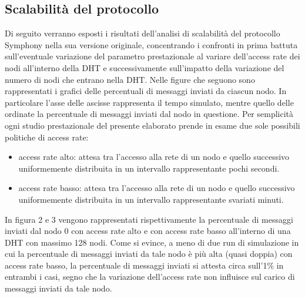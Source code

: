 \documentclass[	
	DIV=calc,
	paper=a4,
	fontsize=11pt,
	onecolumn
]{scrartcl} %
\begin{document}
	\subsection{Scalabilità del protocollo}
	Di seguito verranno esposti i risultati dell'analisi di scalabilità del protocollo Symphony nella sua versione originale, concentrando i confronti in prima battuta sull'eventuale variazione del parametro prestazionale al variare dell'access rate dei nodi all'interno della DHT e successivamente sull'impatto della variazione del numero di nodi che entrano nella DHT.
Nelle figure che seguono sono rappresentati i grafici delle percentuali di messaggi inviati da ciascun nodo. In particolare l'asse delle ascisse rappresenta il tempo simulato, mentre quello delle ordinate la percentuale di messaggi inviati dal nodo in questione. Per semplicità ogni studio prestazionale del presente elaborato prende in esame due sole possibili politiche di access rate:
	\begin{itemize}
		\item access rate alto: attesa tra l'accesso alla rete di un nodo e quello successivo uniformemente distribuita in un intervallo rappresentante pochi secondi.
		\item access rate basso: attesa tra l'accesso alla rete di un nodo e quello successivo uniformemente distribuita in un intervallo rappresentante svariati minuti.
	\end{itemize}

	In figura 2 e 3 vengono rappresentati rispettivamente la percentuale di messaggi inviati dal nodo 0 con access rate alto e con access rate basso all'interno di una DHT con massimo 128 nodi. Come si evince, a meno di due run di simulazione in cui la percentuale di messaggi inviati da tale nodo è più alta (quasi doppia) con access rate basso, la percentuale di messaggi inviati si attesta circa sull'1\% in entrambi i casi, segno che la variazione dell'access rate non influisce sul carico di messaggi inviati da tale nodo.  
	
\end{document}
